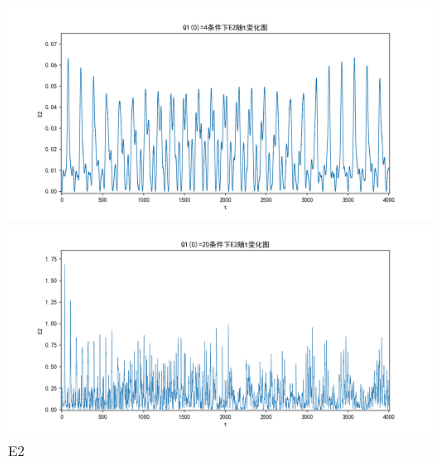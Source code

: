 \documentclass[10pt, a4paper]{article}
\begin{document}
    \begin{figure}[H]
        \begin{minipage}[t]{0.49\textwidth}
            \centering
            \includegraphics[width=\textwidth]{./q5_pics/cmp/E2.png}
        \end{minipage}
        \begin{minipage}[t]{0.49\textwidth}
            \centering
            \includegraphics[width=\textwidth]{./q5_pics/exp/E2.png}
        \end{minipage}
        \caption{E2}\label{fig:E2 in q5}
    \end{figure}
\end{document}
